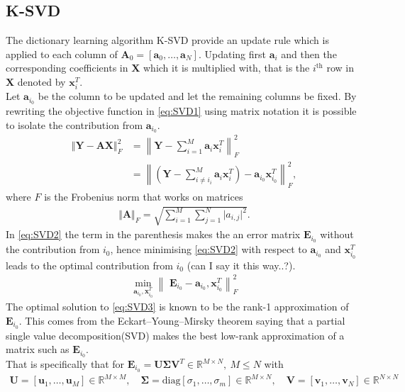 \subsection{K-SVD}
The dictionary learning algorithm K-SVD provide an update rule which is applied to each column of $\textbf{A}_0 = \left[ \textbf{a}_0, \hdots , \textbf{a}_N \right] $. Updating first $\textbf{a}_i$ and then the corresponding coefficients in $\textbf{X}$ which it is multiplied with, that is the $i^{\text{th}}$ row in $\textbf{X}$ denoted by $\textbf{x}_i^T$.\\
Let $\textbf{a}_{i_{0}}$ be the column to be updated and let the remaining columns be fixed. By rewriting the objective function in \eqref{eq:SVD1} using matrix notation it is possible to isolate the contribution from $\textbf{a}_{i_{0}}$.
\begin{align}
\Vert \textbf{Y} - \textbf{AX} \Vert_{F}^{2} 
&= \left\| \textbf{Y} - \sum_{i=1}^{M} \textbf{a}_i \textbf{x}_i^{T} \right\|_{F}^{2}\nonumber\\
&= \left\| \left( \textbf{Y}- \sum_{i\neq i_{i}}^{M} \textbf{a}_i\textbf{x}_i^{T}\right) - \textbf{a}_{i_{0}}\textbf{x}_{i_{0}}^{T} \right\| _{F}^{2},\label{eq:SVD2} 
\end{align}
where $F$ is the Frobenius norm that works on matrices
\begin{align*}
\Vert \mathbf{A} \Vert_F = \sqrt{\sum_{i=1}^M \sum_{j=1}^N \vert a_{i,j} \vert^2}.
\end{align*} 
In \eqref{eq:SVD2} the term in the parenthesis makes the an error matrix $\textbf{E}_{i_0}$ without the contribution from $i_{0}$, hence minimising \eqref{eq:SVD2} with respect to $\textbf{a}_{i_{0}}$ and $\textbf{x}_{i_{0}}^{T}$ leads to the optimal contribution from $i_{0}$ (can I say it this way..?). 
\begin{align}
\min_{\textbf{a}_{i_{0}},\textbf{x}_{i_0}^{T}}\left\|\textbf{ E}_{i_{0}}-\textbf{a}_{i_{0}},\textbf{x}_{i_0}^{T} \right\|_{F}^{2}\label{eq:SVD3}
\end{align} 
The optimal solution to \eqref{eq:SVD3} is known to be the rank-1 approximation of $\textbf{E}_{i_{0}}$. This comes from the Eckart–Young–Mirsky theorem\cite{?} saying that a partial single value decomposition(SVD) makes the best low-rank approximation of a matrix such as $\textbf{E}_{i_0}$.\\
That is specifically that for $\textbf{E}_{i_0}=\textbf{U}\boldsymbol{\Sigma}\textbf{V}^T\in \mathbb{R}^{M\times N},\ M \leq N$ with 
\begin{align*}
\textbf{U}=\left[\textbf{u}_1, \hdots, \textbf{u}_M\right] \in \mathbb{R}^{M\times M}, \quad \boldsymbol{\Sigma}=\text{diag}\left[\sigma_1, \hdots , \sigma_m \right] \in \mathbb{R}^{M\times N}, \quad \textbf{V}=\left[\textbf{v}_1, \hdots, \textbf{v}_N\right] \in \mathbb{R}^{N\times N} 
\end{align*}  
